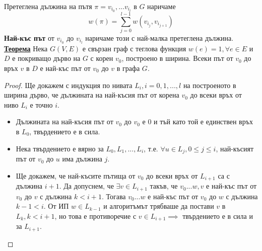 \documentclass{article}
\begin{document}
Претеглена дължина на пътя $\pi = v_{i_0}, ... v_{i_l}$ в $G$ наричаме $$w(\pi) = \sum_{j=0}^{l-1}w(v_{i_j}, v_{i_{j+1}})$$
\textbf{Най-къс път} от $v_{i_0}$ до $v_{i_l}$ наричаме този с най-малка претеглена дължина. \newline\newline
\textbf{\underline{Теорема}} \newline
Нека $G(V, E)$ е свързан граф с теглова функция $w(e) = 1, \forall e \in E$ и $D$ е покриващо дърво на $G$ с корен $v_0$, построено в ширина.
Всеки път от $v_0$ до връх $v$ в $D$ е най-къс път от $v_0$ до $v$ в графа $G$.
\begin{proof}
Ще докажем с индукция по нивата $L_i, i = 0, 1, ..., l$ на построеното в ширина дърво, че дължината на най-късия път от корена $v_0$ до всеки връх
от ниво $L_i$ е точно $i$.
\begin{itemize}
    \item Дължината на най-късия път от $v_0$ до $v_0$ е $0$ и тъй като той е единствен връх в $L_0$, твърдението е в сила.
    \item Нека твърдението е вярно за $L_0, L_1, ..., L_i$, т.е. $\forall u \in L_j, 0 \le j \le i$, най-късият път от $v_0$ до $u$ има дължина $j$.
    \item Ще докажем, че най-късите пътища от $v_0$ до всеки връх от $L_{i+1}$ са с дължина $i + 1$. Да допуснем, че $\exists v \in L_{i+1}$ такъв, че
    $v_0...w, v$ е най-къс път от $v_0$ до $v$ с дължина $k < i + 1$. Тогава $v_0...w$ е най-къс път от $v_0$ до $w$ с дължина $k - 1 < i$. От ИП
    $w \in L_{k-1}$ и алгоритъмът трябваше да постави $v$ в $L_k, k < i + 1$, но това е противоречие с $v \in L_{i+1} \implies$ твърдението е в сила и за $L_{i+1}$.
\end{itemize}
\end{proof}
\end{document}
